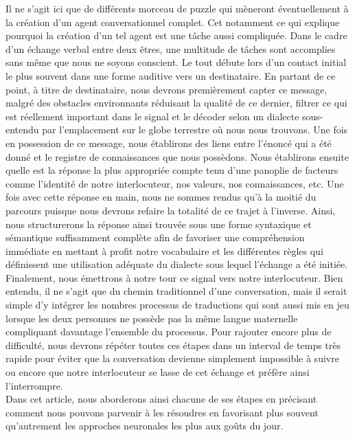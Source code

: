 Il ne s'agit ici que de différents morceau de puzzle qui mèneront éventuellement à la création d'un agent conversationnel complet. Cet notamment ce qui explique pourquoi la création d'un tel agent est une tâche aussi compliquée. Dans le cadre d'un échange verbal entre deux êtres, une multitude de tâches sont accomplies sans même que nous ne soyons conscient. Le tout débute lors d'un contact initial le plus souvent dans une forme auditive vers un destinataire. En partant de ce point, à titre de destinataire, nous devrons premièrement capter ce message, malgré des obstacles environnants réduisant la qualité de ce dernier, filtrer ce qui est réellement important dans le signal et le décoder selon un dialecte sous-entendu par l'emplacement sur le globe terrestre où nous nous trouvons. Une fois en possession de ce message, nous établirons des liens entre l'énoncé qui a été donné et le registre de connaissances que nous possèdons. Nous établirons ensuite quelle est la réponse la plus appropriée compte tenu d'une panoplie de facteurs comme l'identité de notre interlocuteur, nos valeurs, nos connaissances, etc. Une fois avec cette réponse en main, nous ne sommes rendus qu'à la moitié du parcours puisque nous devrons refaire la totalité de ce trajet à l'inverse. Ainsi, nous structurerons la réponse ainsi trouvée sous une forme syntaxique et sémantique suffisamment complète afin de favoriser une compréhension immédiate en mettant à profit notre vocabulaire et les différentes règles qui définissent une utilisation adéquate du dialecte sous lequel l'échange a été initiée. Finalement, nous émettrons à notre tour ce signal vers notre interlocuteur. Bien entendu, il ne s'agit que du chemin traditionnel d'une conversation, mais il serait simple d'y intégrer les nombres processus de traductions qui sont aussi mis en jeu lorsque les deux personnes ne possède pas la même langue maternelle compliquant davantage l'ensemble du processus. Pour rajouter encore plus de difficulté, nous devrons répéter toutes ces étapes dans un interval de temps très rapide pour éviter que la conversation devienne simplement impossible à suivre ou encore que notre interlocuteur se lasse de cet échange et préfère ainsi l'interrompre.\\

Dans cet article, nous aborderons ainsi chacune de ses étapes en précisant comment nous pouvons parvenir à les résoudres en favorisant plus souvent qu'autrement les approches neuronales les plus aux goûts du jour.
